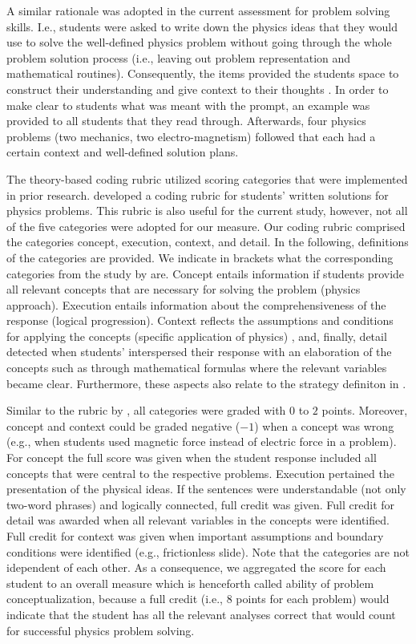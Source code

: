 \documentclass[D:/studies/WinnerS/Erhebungen/IPhO1718/paper/problem_solving/main/TaylorFrancis/interactapasample]{subfiles}
\begin{document}
A similar rationale was adopted in the current assessment for problem solving skills. I.e., students were asked to write down the physics ideas that they would use to solve the well-defined physics problem without going through the whole problem solution process (i.e., leaving out problem representation and mathematical routines). Consequently, the items provided the students space to construct their understanding and give context to their thoughts \citep{Hammann.2014}. In order to make clear to students what was meant with the prompt, an example was provided to all students that they read through. Afterwards, four physics problems (two mechanics, two electro-magnetism) followed that each had a certain context and well-defined solution plans.

The theory-based coding rubric utilized scoring categories that were implemented in prior research. \cite{Docktor.2016} developed a coding rubric for students' written solutions for physics problems. This rubric is also useful for the current study, however, not all of the five categories were adopted for our measure. Our coding rubric comprised the categories concept, execution, context, and detail. In the following, definitions of the categories are provided. We indicate in brackets what the corresponding categories from the study by \cite{Docktor.2016} are. Concept entails information if students provide all relevant concepts that are necessary for solving the problem (physics approach). Execution entails information about the comprehensiveness of the response (logical progression). Context reflects the assumptions and conditions for applying the concepts (specific application of physics) \citep{Fortus.2009}, and, finally, detail detected when students' interspersed their response with an elaboration of the concepts such as through mathematical formulas where the relevant variables became clear. Furthermore, these aspects also relate to the strategy definiton in \cite{Leonard.1996}. 

Similar to the rubric by \cite{Docktor.2016}, all categories were graded with $0$ to $2$ points. Moreover, concept and context could be graded negative ($-1$) when a concept was wrong (e.g., when students used magnetic force instead of electric force in a problem). For concept the full score was given when the student response included all concepts that were central to the respective problems. Execution pertained the presentation of the physical ideas. If the sentences were understandable (not only two-word phrases) and logically connected, full credit was given. Full credit for detail was awarded when all relevant variables in the concepts were identified. Full credit for context was given when important assumptions and boundary conditions were identified (e.g., frictionless slide). Note that the categories are not idependent of each other. As a consequence, we aggregated the score for each student to an overall measure which is henceforth called ability of problem conceptualization, because a full credit (i.e., $8$ points for each problem) would indicate that the student has all the relevant analyses correct that would count for successful physics problem solving.
\end{document}
